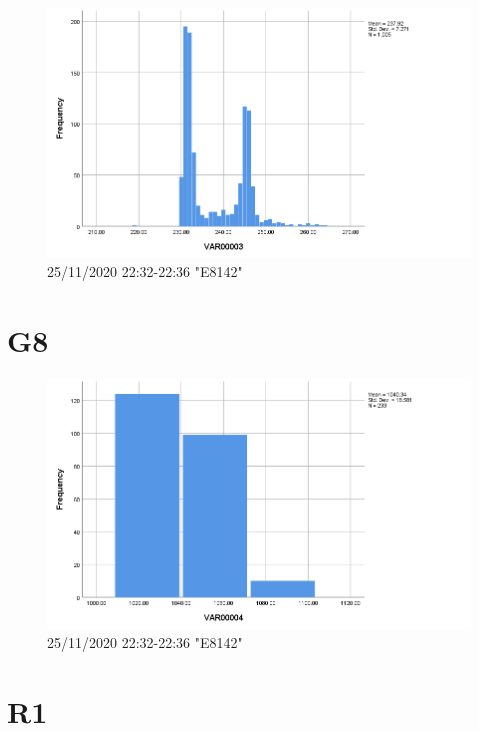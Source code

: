 \documentclass[hidelinks, 12pt, a4paper]{article}
\begin{document}
\begin{figure}[h!]
	\centering
		\includegraphics[height=.38\textheight, width=\textwidth]{assets/session1/g7.png}
    \caption{25/11/2020 22:32-22:36 "E8142"} 
	\end{figure}

\section{G8}

\begin{figure}[h!]
	\centering
		\includegraphics[height=.38\textheight, width=\textwidth]{assets/session1/g8.png}
    \caption{25/11/2020 22:32-22:36 "E8142"} 
	\end{figure}

\section{R1}
\end{document}
